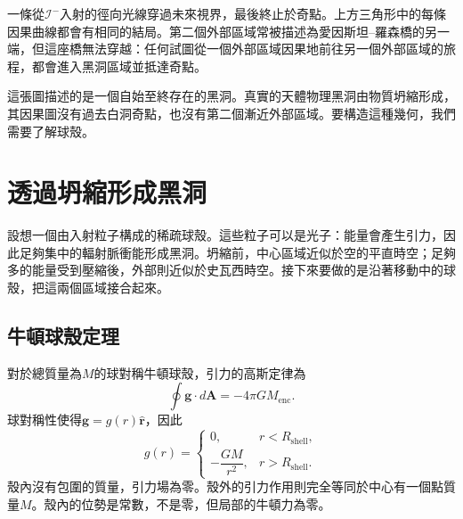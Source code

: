 一條從\(\mathcal{I}^-\)入射的徑向光線穿過未來視界，最後終止於奇點。上方三角形中的每條因果曲線都會有相同的結局。第二個外部區域常被描述為愛因斯坦--羅森橋的另一端，但這座橋無法穿越：任何試圖從一個外部區域因果地前往另一個外部區域的旅程，都會進入黑洞區域並抵達奇點。

\begin{classroomqa}
\end{classroomqa}

這張圖描述的是一個自始至終存在的黑洞。真實的天體物理黑洞由物質坍縮形成，其因果圖沒有過去白洞奇點，也沒有第二個漸近外部區域。要構造這種幾何，我們需要了解球殼。

\section{透過坍縮形成黑洞}

設想一個由入射粒子構成的稀疏球殼。這些粒子可以是光子：能量會產生引力，因此足夠集中的輻射脈衝能形成黑洞。坍縮前，中心區域近似於空的平直時空；足夠多的能量受到壓縮後，外部則近似於史瓦西時空。接下來要做的是沿著移動中的球殼，把這兩個區域接合起來。

\subsection{牛頓球殼定理}

對於總質量為\(M\)的球對稱牛頓球殼，引力的高斯定律為
\begin{equation}
\oint \mathbf{g}\cdot d\mathbf{A}=-4\pi G M_{\mathrm{enc}}.
\label{eq:l04-gauss-gravity}
\end{equation}
球對稱性使得\(\mathbf{g}=g(r)\hat{\mathbf r}\)，因此
\begin{equation}
g(r)=
\begin{cases}
0, & r<R_{\mathrm{shell}},\\[4pt]
-\dfrac{GM}{r^2}, & r>R_{\mathrm{shell}}.
\end{cases}
\label{eq:l04-shell-field}
\end{equation}
殼內沒有包圍的質量，引力場為零。殼外的引力作用則完全等同於中心有一個點質量\(M\)。殼內的位勢是常數，不是零，但局部的牛頓力為零。

